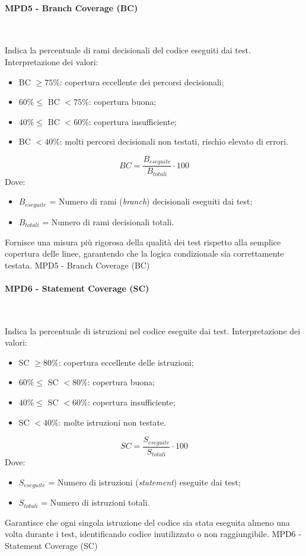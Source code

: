\documentclass[10pt, letterpaper]{article}
\newcommand{\trisubsection}[1]{\paragraph{#1}\mbox{}\\}
\begin{document}
\trisubsection{MPD5 - Branch Coverage (BC)}
{Indica la percentuale di rami decisionali del codice eseguiti dai test.
    Interpretazione dei valori:
    \begin{itemize}
        \item BC $\geq 75\%$: copertura eccellente dei percorsi decisionali;
        \item $60\% \leq $ BC $ < 75\%$: copertura buona;
        \item $40\% \leq $ BC $ < 60\%$: copertura insufficiente;
        \item BC $< 40\%$: molti percorsi decisionali non testati, rischio elevato di errori.
    \end{itemize}}
{\[ BC = \frac{B_{eseguite}}{B_{totali}} \cdot 100 \]
    Dove:
    \begin{itemize}
        \item $B_{eseguite}$ = Numero di rami (\textit{branch}) decisionali eseguiti dai test;
        \item $B_{totali}$ = Numero di rami decisionali totali.
    \end{itemize}}
{Fornisce una misura più rigorosa della qualità dei test rispetto alla
    semplice copertura delle linee, garantendo che la logica condizionale sia
    correttamente testata.}
{MPD5 - Branch Coverage (BC)}

\trisubsection{MPD6 - Statement Coverage (SC)}
{Indica la percentuale di istruzioni nel codice eseguite dai test.
    Interpretazione dei valori:
    \begin{itemize}
        \item SC $\geq 80\%$: copertura eccellente delle istruzioni;
        \item $60\% \leq $ SC $ < 80\%$: copertura buona;
        \item $40\% \leq $ SC $ < 60\%$: copertura insufficiente;
        \item SC $< 40\%$: molte istruzioni non testate.
    \end{itemize}}
{\[ SC = \frac{S_{eseguite}}{S_{totali}} \cdot 100 \]
    Dove:
    \begin{itemize}
        \item $S_{eseguite}$ = Numero di istruzioni (\textit{statement}) eseguite dai test;
        \item $S_{totali}$ = Numero di istruzioni totali.
    \end{itemize}}
{Garantisce che ogni singola istruzione del codice sia stata eseguita almeno
    una volta durante i test, identificando codice inutilizzato o non raggiungibile.}
{MPD6 - Statement Coverage (SC)}
\end{document}
